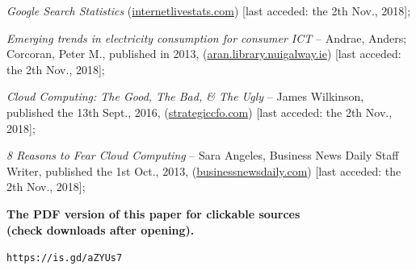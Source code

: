 \documentclass[final, a4paper, 9.5pt]{article}
\begin{document}
\newpage

\begin{thebibliography}{9}
    \emph{Google Search Statistics}  (\href{http://www.internetlivestats.com/google-search-statistics/}{internetlivestats.com}) [last acceded: the 2th Nov., 2018];
    
    \emph{Emerging trends in electricity consumption for consumer ICT} --
    Andrae, Anders; Corcoran, Peter M., published in 2013,
    (\href{https://aran.library.nuigalway.ie/bitstream/handle/10379/3563/CA_MainArticle14_all-v02.pdf?sequence=4&isAllowed=y}{aran.library.nuigalway.ie}) [last acceded: the 2th Nov., 2018];
    
    \emph{Cloud Computing: The Good, The Bad, \& The Ugly} --
    James Wilkinson, published the 13th Sept., 2016,
    (\href{https://strategiccfo.com/cloud-computing-good-bad-ugly/}{strategiccfo.com}) [last acceded: the 2th Nov., 2018];
    
    \emph{8 Reasons to Fear Cloud Computing} --
    Sara Angeles, Business News Daily Staff Writer, published the 1st Oct., 2013,
    (\href{https://www.businessnewsdaily.com/5215-dangers-cloud-computing.html}{businessnewsdaily.com}) [last acceded: the 2th Nov., 2018];

\end{thebibliography}

\vspace*{\fill}

{\centering \setlength{\parskip}{1cm}

\textbf{
The PDF version of this paper for clickable sources\\(check downloads after opening).}


\texttt{https://is.gd/aZYUs7}

}

\vspace*{\fill}
\end{document}
